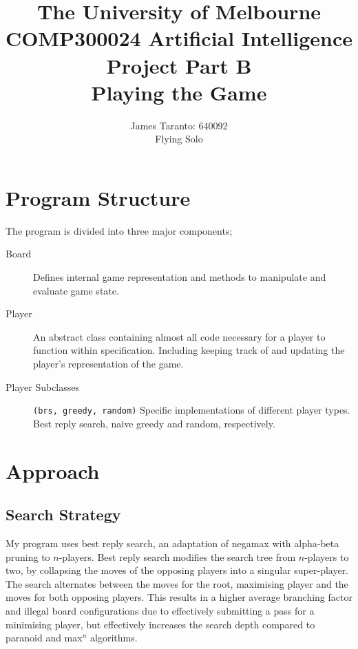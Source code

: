 \documentclass[a4paper,10pt,draft]{article}
\title{
	{\small
	The University of Melbourne\\
	COMP300024 Artificial Intelligence\\[0.2em]
	}
    Project Part B\\[0.2em]
    \small Playing the Game\\
}
\author{
    James Taranto: 640092\\Flying Solo
}
\begin{document}
\maketitle
\section{Program Structure}
The program is divided into three major components;
\begin{description}
	\item[Board] Defines internal game representation and methods to manipulate and evaluate game state.
	\item[Player] An abstract class containing almost all code necessary for a player to function within specification. Including keeping track of and updating the player's representation of the game.
	\item[Player Subclasses] \texttt{(brs, greedy, random)} Specific implementations of different player types. Best reply search, naive greedy and random, respectively. 
\end{description} 
\section{Approach}
\subsection{Search Strategy}
My program uses best reply search,\cite{schadd2011best} an adaptation of negamax with alpha-beta pruning to $n$-players. Best reply search modifies the search tree from $n$-players to two, by collapsing the moves of the opposing players into a singular super-player. The search alternates between the moves for the root, maximising player and the moves for both opposing players. This results in a higher average branching factor and illegal board configurations due to effectively submitting a pass for a minimising player, but effectively increases the search depth compared to paranoid and max$^n$ algorithms.
\end{document}
